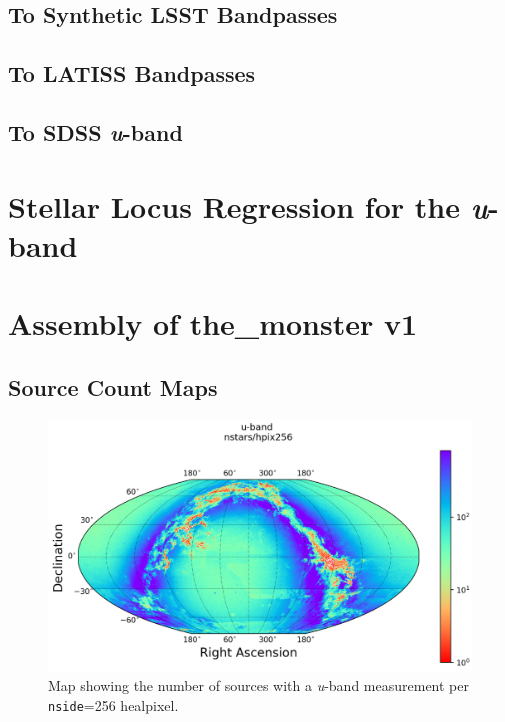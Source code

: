 \subsection{To Synthetic LSST Bandpasses}
\subsection{To LATISS Bandpasses}
\subsection{To SDSS \textit{u}-band}

\section{Stellar Locus Regression for the \textit{u}-band}
\label{sec:slr}

\section{Assembly of the\_monster v1}
\label{sec:assembly}
\subsection{Source Count Maps}
\begin{figure}
    \centering
    \includegraphics[width=\linewidth]{./figures/source_density_maps/u-band/u-band-counts-full.png}
    \caption{Map showing the number of sources with a \textit{u}-band measurement per \texttt{nside}=256 healpixel.}
    \label{source-counts-u}
\end{figure}

